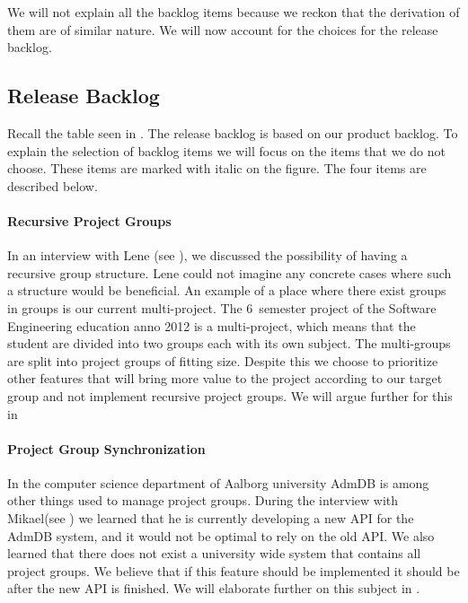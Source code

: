 We will not explain all the backlog items because we reckon that the derivation of them are of similar nature.
We will now account for the choices for the release backlog.

\subsection{Release Backlog}
Recall the table seen in . 
The release backlog is based on our product backlog.
To explain the selection of backlog items we will focus on the items that we do not choose.
These items are marked with italic on the figure.
The four items are described below.

\paragraph{Recursive Project Groups}
In an interview with Lene (see ), we discussed the possibility of having a recursive group structure.
Lene could not imagine any concrete cases where such a structure would be beneficial. 
An example of a place where there exist groups in groups is our current multi-project.
The 6\ths~semester project of the Software Engineering education anno 2012 is a multi-project, which means that the student are divided into two groups each with its own subject. 
The multi-groups are split into project groups of fitting size.
Despite this we choose to prioritize other features that will bring more value to the project according to our target group and not implement recursive project groups.
We will argue further for this in \secref{} 

\paragraph{Project Group Synchronization}
In the computer science department of Aalborg university AdmDB is among other things used to manage project groups. 
During the interview with Mikael(see ) we learned that he is currently developing a new API for the AdmDB system, and it would not be optimal to rely on the old API. 
We also learned that there does not exist a university wide system that contains all project groups. 
We believe that if this feature should be implemented it should be after the new API is finished.
We will elaborate further on this subject in . 


